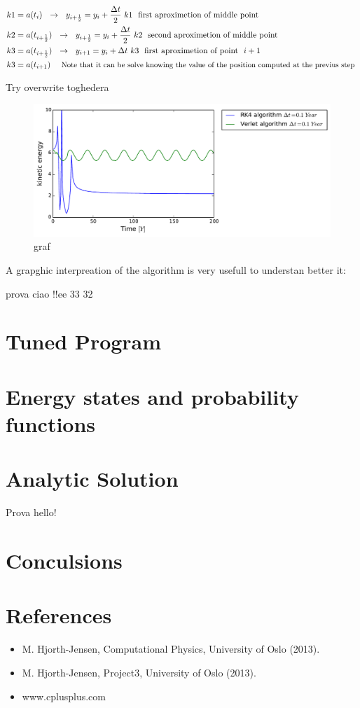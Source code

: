 \documentclass[a4paper]{article}
\begin{document}
\begin{align}
k1 &= a(t_i) \ \  \to \  \  y_{i+ \frac{1}{2}} = y_i + \frac{\Delta t}{2} \ k1 \ \ \text{first aproximetion of middle point} \\
k2 &= a(t_{i+ \frac{1}{2}}) \ \  \to \ \ y_{i+ \frac{1}{2}} = y_i + \frac{\Delta t}{2} \ k2 \ \ \text{second aproximetion of middle point} \\
k3 &= a(t_{i+ \frac{1}{2}}) \ \  \to \ \ y_{i+1} = y_i + \Delta t \ k3 \ \ \text{first aproximetion of point } \ i + 1 \\
k3 &= a(t_{i+ 1}) \ \ \  \  \text{\small{Note that it can be solve knowing the value of the position computed at the previus step  }}
\end{align}




Try overwrite toghedera







 \begin{figure}[H]
\includegraphics[width=1.02\textwidth]{outvel.pdf}
\caption{graf}
\end{figure}


A grapghic interpreation of the algorithm is very usefull to understan better it:

prova ciao !!ee 33
32
\section{Tuned Program}
\section{Energy states and probability functions}\label{2electrons}

\pagebreak
\section{Analytic Solution}
Prova hello!
\pagebreak
\section{Conculsions}

\section{References}
\begin{itemize}
\item M. Hjorth-Jensen, 
Computational Physics, University of Oslo (2013).
\item M. Hjorth-Jensen, 
Project3, University of Oslo (2013).
\item www.cplusplus.com
\end{itemize}
\end{document}
